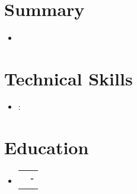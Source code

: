\documentclass[letterpaper,11pt]{article}
\makeatletter
\newcommand{\resumeSubheading}[4]{
  \vspace{-4pt}\item
    \begin{tabular*}{1.0\textwidth}[t]{l@{\extracolsep{\fill}}r}
      \textbf{#1} & \textbf{\small #2} \\
      \textit{\small#3} & \textit{\small #4} \\
    \end{tabular*}\vspace{-10pt}
}
\newcommand{\resumeSubHeadingListStart}{\begin{itemize}[leftmargin=0.0in, label={}]}
\newcommand{\resumeSubHeadingListEnd}{\end{itemize}}
\makeatother
\begin{document}
\vspace{5pt}

\begin{center}
    {\Huge \scshape {}} \\ \vspace{5pt}
    {\hspace{-30pt}}
    {\small {} \textbar\:  \textbar\: \href{mailto:\VAR{resume.email}}{\underline{}} \textbar\: \href{\VAR{"https://www."+resume.linkedinUrl}}{\underline{}} \textbar\: \href{\VAR{"https://www."+resume.githubUrl}}{\underline{}}}
    \vspace{-8pt}
\end{center}


\section*{Summary}
\begin{itemize}[leftmargin=0.05in, label={}]
 \item[] {\small {}}
\end{itemize}
\vspace{-8pt} 

\section*{Technical Skills}
\begin{itemize}[leftmargin=0.05in, label={}]
 \item[] {\small
{}
    \textbf{}{:}   \\
 }
\end{itemize}
\vspace{-14pt}

\section*{Education}
  \resumeSubHeadingListStart
    \resumeSubheading
      {\VAR{edu.school}}{\VAR{edu.startDate} - \VAR{edu.endDate}}
      {\VAR{edu.degree}}{\VAR{edu.location}}
  \resumeSubHeadingListEnd
\end{document}
